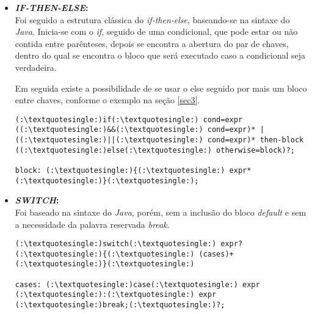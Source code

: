         		\begin{itemize}
        			\item \textbf{\textit{IF-THEN-ELSE}:}\\
        				Foi seguido a estrutura clássica do \textit{if-then-else}, baseando-se na sintaxe do \textit{Java}. Inicia-se com o \textit{if}, seguido de uma condicional, que pode estar ou não contida entre parênteses, depois se encontra a abertura do par de chaves, dentro do qual se encontra o bloco que será executado caso a condicional seja verdadeira.
        				
        				Em seguida existe a possibilidade de se usar o else seguido por mais um bloco entre chaves, conforme o exemplo na seção \ref{sec3}.
        			
					\begin{lstlisting}
(:\textquotesingle:)if(:\textquotesingle:) cond=expr ((:\textquotesingle:)&&(:\textquotesingle:) cond=expr)* | ((:\textquotesingle:)||(:\textquotesingle:) cond=expr)* then-block ((:\textquotesingle:)else(:\textquotesingle:) otherwise=block)?;

block: (:\textquotesingle:){(:\textquotesingle:) expr* (:\textquotesingle:)}(:\textquotesingle:);
        				\end{lstlisting}
        			
        			\item \textbf{\textit{SWITCH}:}\\
        				Foi baseado na sintaxe do \textit{Java}, porém, sem a inclusão do bloco \textit{default} e sem a necessidade da palavra reservada \textit{break}.
        				\begin{lstlisting}
(:\textquotesingle:)switch(:\textquotesingle:) expr? (:\textquotesingle:){(:\textquotesingle:) (cases)+ (:\textquotesingle:)}(:\textquotesingle:)

cases: (:\textquotesingle:)case(:\textquotesingle:) expr (:\textquotesingle:):(:\textquotesingle:) expr (:\textquotesingle:)break;(:\textquotesingle:)?;
        				\end{lstlisting}
        		\end{itemize}
        
